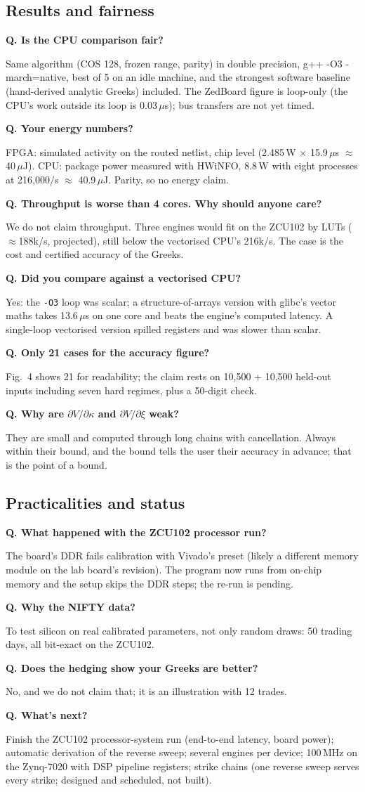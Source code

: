 \documentclass[11pt,a4paper]{article}
\newcounter{qn}
\newcommand{\qa}[2]{\stepcounter{qn}\par\medskip\noindent\textbf{Q\theqn. #1}\par\noindent #2\par}
\begin{document}
\subsection{Results and fairness}
\qa{Is the CPU comparison fair?}{Same algorithm (COS 128, frozen range, parity) in double precision, g++ -O3 -march=native, best of 5 on an idle machine, and the strongest software baseline (hand-derived analytic Greeks) included. The ZedBoard figure is loop-only (the CPU's work outside its loop is 0.03\,$\mu$s); bus transfers are not yet timed.}
\qa{Your energy numbers?}{FPGA: simulated activity on the routed netlist, chip level (2.485\,W $\times$ 15.9\,$\mu$s $\approx$ 40\,$\mu$J). CPU: package power measured with HWiNFO, 8.8\,W with eight processes at 216,000/s $\approx$ 40.9\,$\mu$J. Parity, so no energy claim.}
\qa{Throughput is worse than 4 cores. Why should anyone care?}{We do not claim throughput. Three engines would fit on the ZCU102 by LUTs ($\approx$188k/s, projected), still below the vectorised CPU's 216k/s. The case is the cost and certified accuracy of the Greeks.}
\qa{Did you compare against a vectorised CPU?}{Yes: the \texttt{-O3} loop was scalar; a structure-of-arrays version with glibc's vector maths takes 13.6\,$\mu$s on one core and beats the engine's computed latency. A single-loop vectorised version spilled registers and was slower than scalar.}
\qa{Only 21 cases for the accuracy figure?}{Fig.~4 shows 21 for readability; the claim rests on 10,500 + 10,500 held-out inputs including seven hard regimes, plus a 50-digit check.}
\qa{Why are $\partial V/\partial\kappa$ and $\partial V/\partial\xi$ weak?}{They are small and computed through long chains with cancellation. Always within their bound, and the bound tells the user their accuracy in advance; that is the point of a bound.}

\subsection{Practicalities and status}
\qa{What happened with the ZCU102 processor run?}{The board's DDR fails calibration with Vivado's preset (likely a different memory module on the lab board's revision). The program now runs from on-chip memory and the setup skips the DDR steps; the re-run is pending.}
\qa{Why the NIFTY data?}{To test silicon on real calibrated parameters, not only random draws: 50 trading days, all bit-exact on the ZCU102.}
\qa{Does the hedging show your Greeks are better?}{No, and we do not claim that; it is an illustration with 12 trades.}
\qa{What's next?}{Finish the ZCU102 processor-system run (end-to-end latency, board power); automatic derivation of the reverse sweep; several engines per device; 100\,MHz on the Zynq-7020 with DSP pipeline registers; strike chains (one reverse sweep serves every strike; designed and scheduled, not built).}
\end{document}
